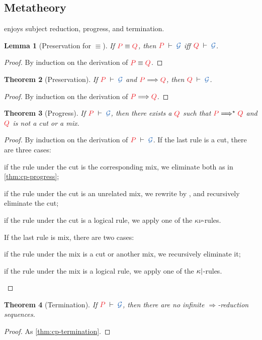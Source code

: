 \documentclass[submission,copyright,creativecommons]{eptcs}
\newtheorem{lemma}{Lemma}[section]
\newtheorem{theorem}[lemma]{Theorem}
\begin{document}
\subsection{Metatheory}
\hcp enjoys subject reduction, progress, and termination.
\begin{lemma}[Preservation for $\equiv$]\label{lem:hcp-preservation-equiv}
  If $\tm{P}\equiv\tm{Q}$, then $\seq[P]{\mathcal{G}}$ iff $\seq[Q]{\mathcal{G}}$.
\end{lemma}\vspace*{-0.75\baselineskip}%
\begin{proof}
  By induction on the derivation of $\tm{P}\equiv\tm{Q}$.
\end{proof}%
\begin{theorem}[Preservation]\label{thm:hcp-preservation}
  If $\seq[P]{\mathcal{G}}$ and $\reducesto{P}{Q}$, then $\seq[Q]{\mathcal{G}}$.
\end{theorem}\vspace*{-0.75\baselineskip}%
\begin{proof}
  By induction on the derivation of $\reducesto{P}{Q}$.
\end{proof}%
\begin{theorem}[Progress]\label{thm:hcp-progress}
  If $\seq[P]{\mathcal{G}}$, then there exists a $\tm{Q}$ such that
  $\tm{P}\Longrightarrow^\star\tm{Q}$ and $\tm{Q}$ is not a cut or a mix.
\end{theorem}\vspace*{-0.75\baselineskip}%
\begin{proof}
  By induction on the derivation of $\seq[P]{\mathcal{G}}$. If the last rule is a cut, there are three cases:
  \begin{enumerate*}[label={\alph*)}]
  \item
    if the rule under the cut is the corresponding mix, we eliminate both as in
    \cref{thm:cp-progress};
  \item
    if the rule under the cut is an unrelated mix, we rewrite by \hccpEquivScopeExt{}, and recursively eliminate the cut;
  \item
    if the rule under the cut is a logical rule, we apply one of the $\kappa\nu$-rules.
  \end{enumerate*}
  If the last rule is mix, there are two cases:
  \begin{enumerate*}[label={\alph*)}]
  \item
    if the rule under the mix is a cut or another mix, we recursively eliminate it;
  \item
    if the rule under the mix is a logical rule, we apply one of the
    $\kappa{\ensuremath{\mid}}$-rules.
  \end{enumerate*}
\end{proof}%
\begin{theorem}[Termination]\label{thm:hcp-termination}
  If $\seq[P]{\mathcal{G}}$, then there are no infinite $\Longrightarrow$-reduction sequences.
\end{theorem}\vspace*{-0.75\baselineskip}%
\begin{proof}
  As \cref{thm:cp-termination}.
\end{proof}
\end{document}
